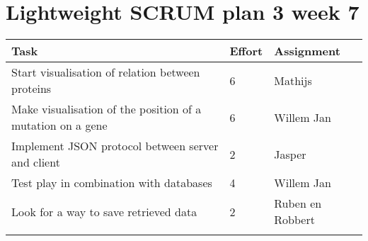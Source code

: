 \documentclass[a4paper]{report}
\begin{document}


\section*{Lightweight SCRUM plan 3 week 7}

\setlength\extrarowheight{5pt}
\begin{table}[ht]
\begin{tabular}{p{8cm}|p{2cm}|p{3cm}}

\textbf{Task} & \textbf{Effort} & \textbf{Assignment}\\
\hline \hline

Start visualisation of relation between proteins & 6 & Mathijs \\
Make visualisation of the position of a mutation on a gene & 6 & Willem Jan\\

Implement JSON protocol between server and client & 2 & Jasper\\
Test play in combination with databases & 4 & Willem Jan\\
Look for a way to save retrieved data & 2 & Ruben en Robbert\\

\vspace{10pt} & \vspace{10pt} & \vspace{10pt}\\

\end{tabular}
\end{table}
\end{document}
